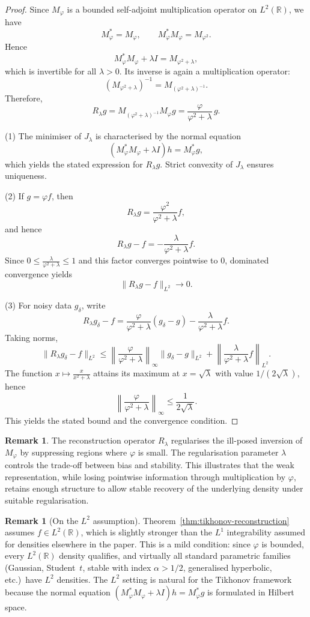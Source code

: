 \documentclass[12pt]{article}
\theoremstyle{definition}
\newtheorem{remark}[theorem]{Remark}
\newcommand{\R}{\mathbb{R}}
\begin{document}
\begin{proof}
Since $M_\varphi$ is a bounded self-adjoint multiplication operator on
$L^2(\R)$, we have
\[
M_\varphi^* = M_\varphi,
\qquad
M_\varphi^* M_\varphi = M_{\varphi^2}.
\]
Hence
\[
M_\varphi^* M_\varphi + \lambda I
=
M_{\varphi^2 + \lambda},
\]
which is invertible for all $\lambda>0$. Its inverse is again a
multiplication operator:
\[
(M_{\varphi^2 + \lambda})^{-1}
=
M_{(\varphi^2 + \lambda)^{-1}}.
\]
Therefore,
\[
R_\lambda g
=
M_{(\varphi^2 + \lambda)^{-1}} M_\varphi g
=
\frac{\varphi}{\varphi^2 + \lambda}\, g.
\]

\medskip
\noindent
(1) The minimiser of $J_\lambda$ is characterised by the normal equation
\[
(M_\varphi^* M_\varphi + \lambda I)h = M_\varphi^* g,
\]
which yields the stated expression for $R_\lambda g$. Strict convexity of
$J_\lambda$ ensures uniqueness.

\medskip
\noindent
(2) If $g=\varphi f$, then
\[
R_\lambda g
=
\frac{\varphi^2}{\varphi^2 + \lambda} f,
\]
and hence
\[
R_\lambda g - f
=
-\frac{\lambda}{\varphi^2 + \lambda} f.
\]
Since $0 \le \frac{\lambda}{\varphi^2 + \lambda} \le 1$ and this factor
converges pointwise to $0$, dominated convergence yields
\[
\|R_\lambda g - f\|_{L^2} \to 0.
\]

\medskip
\noindent
(3) For noisy data $g_\delta$, write
\[
R_\lambda g_\delta - f
=
\frac{\varphi}{\varphi^2 + \lambda}(g_\delta - g)
-
\frac{\lambda}{\varphi^2 + \lambda} f.
\]
Taking norms,
\[
\|R_\lambda g_\delta - f\|_{L^2}
\le
\left\|
\frac{\varphi}{\varphi^2 + \lambda}
\right\|_\infty
\|g_\delta - g\|_{L^2}
+
\left\|
\frac{\lambda}{\varphi^2 + \lambda} f
\right\|_{L^2}.
\]
The function $x \mapsto \frac{x}{x^2 + \lambda}$ attains its maximum at
$x=\sqrt{\lambda}$ with value $1/(2\sqrt{\lambda})$, hence
\[
\left\|
\frac{\varphi}{\varphi^2 + \lambda}
\right\|_\infty
\le
\frac{1}{2\sqrt{\lambda}}.
\]
This yields the stated bound and the convergence condition.
\end{proof}

\begin{remark}
The reconstruction operator $R_\lambda$ regularises the ill-posed inversion
of $M_\varphi$ by suppressing regions where $\varphi$ is small. The
regularisation parameter $\lambda$ controls the trade-off between bias and
stability. This illustrates that the weak representation, while losing
pointwise information through multiplication by $\varphi$, retains enough
structure to allow stable recovery of the underlying density under suitable
regularisation.
\end{remark}

\begin{remark}[On the $L^2$ assumption]
Theorem~\ref{thm:tikhonov-reconstruction} assumes $f\in L^2(\R)$, which is
slightly stronger than the $L^1$ integrability assumed for densities
elsewhere in the paper.  This is a mild condition: since $\varphi$ is
bounded, every $L^2(\R)$ density qualifies, and virtually all standard
parametric families (Gaussian, Student~$t$, stable with index $\alpha > 1/2$,
generalised hyperbolic, etc.)\ have $L^2$ densities.  The $L^2$ setting is
natural for the Tikhonov framework because the normal equation
$(M_\varphi^*M_\varphi + \lambda I)h = M_\varphi^*g$ is formulated in
Hilbert space.
\end{remark}
\end{document}

